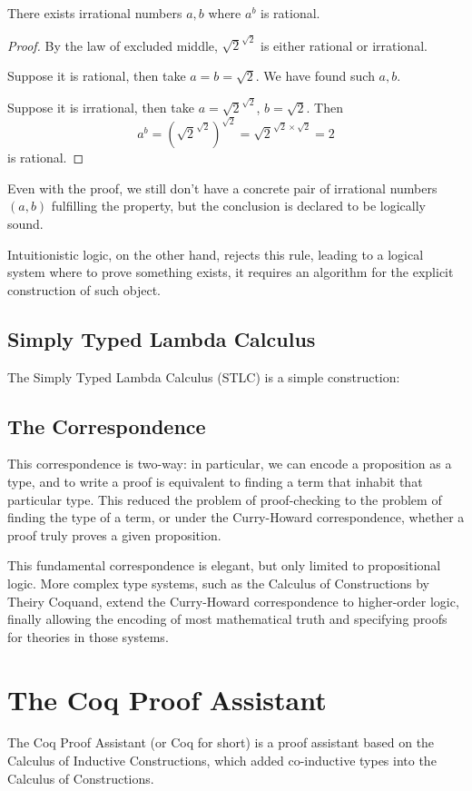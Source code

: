 \begin{theorem}
There exists irrational numbers $a, b$ where $a^b$ is rational.
\end{theorem}
\begin{proof}
By the law of excluded middle, $\sqrt{2}^{\sqrt{2}}$ is either rational or
irrational. 
    
Suppose it is rational, then take $a=b=\sqrt{2}$. We have found such $a,b$.

Suppose it is irrational, then take $a=\sqrt{2}^{\sqrt{2}}$, $b=\sqrt{2}$. Then
\[a^b={\left(\sqrt{2}^{\sqrt{2}}\right)}^{\sqrt{2}}=\sqrt{2}^{\sqrt{2}\times\sqrt{2}}=2\]
is rational.
\end{proof}

Even with the proof, we still don't have a concrete pair of irrational numbers
$(a,b)$ fulfilling the property, but the conclusion is declared to be logically
sound.

Intuitionistic logic, on the other hand, rejects this rule, leading to a logical
system where to prove something exists, it requires an algorithm for the
explicit construction of such object.

\subsection{Simply Typed Lambda Calculus}

The Simply Typed Lambda Calculus (STLC) is a simple construction:

\subsection{The Correspondence}
This correspondence is two-way: in particular, we can encode
a proposition as a type, and to write a proof is equivalent to 
finding a term that inhabit that particular type. This reduced the
problem of proof-checking to the problem of finding the type of a term,
or under the Curry-Howard correspondence, whether a proof truly proves
a given proposition.

This fundamental correspondence is elegant, but only limited to 
propositional logic. More complex type systems, such as the
Calculus of Constructions by Theiry Coquand, extend the Curry-Howard
correspondence to higher-order logic, finally allowing the encoding of
most mathematical truth and specifying proofs for theories in those 
systems.

\section{The Coq Proof Assistant}

The Coq Proof Assistant (or Coq for short) is a proof assistant 
based on the Calculus of Inductive Constructions, which added
co-inductive types into the Calculus of Constructions.